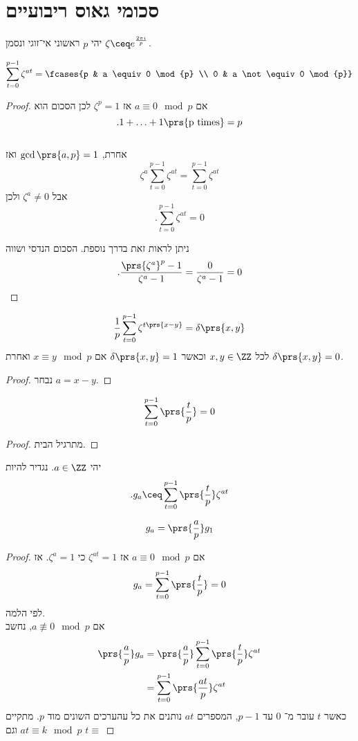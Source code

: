 \documentclass[a4paper,10pt,twoside,openany]{book}
\begin{document}
\section{סכומי גאוס ריבועיים}

יהי
$p$
ראשוני אי־זוגי ונסמן
$\zeta \ceq e^{\frac{2 \pi i}{p}}$.

\begin{lemma}
\[\sum_{t = 0}^{p-1} \zeta^{at} = \fcases{p & a \equiv 0 \mod{p} \\ 0 & a \not\equiv 0 \mod{p}}\]
\end{lemma}
\begin{proof}
אם
$a \equiv 0 \mod{p}$
אז
$\zeta^p = 1$
לכן הסכום הוא
\[ \text{.} 1 + \ldots + 1 \prs{\text{p times}} = p\]
\\
אחרת,
$\gcd \prs{a,p} = 1$
ואז
\[\zeta^a \sum_{t=0}^{p-1} \zeta^{at} = \sum_{t=0}^{p-1} \zeta^{at}\]
אבל
$\zeta^a \neq 0$
ולכן
\[\text{.} \sum_{t=0}^{p-1} \zeta^{at} = 0\]

ניתן לראות זאת בדרך נוספת. הסכום הנדסי ושווה
\begin{align*}
\text{.} \frac{\prs{\zeta^a}^p -1}{\zeta^a - 1} = \frac{0}{\zeta^a - 1} = 0
\end{align*}
\end{proof}

\begin{corollary}
\[\frac{1}{p} \sum_{t=0}^{p-1} \zeta^{t\prs{x-y}} = \delta\prs{x,y}\]
לכל
$x,y \in \ZZ$
וכאשר
$\delta\prs{x,y} = 1$
אם
$x \equiv y \mod {p}$
ואחרת
$\delta\prs{x,y} = 0$.
\end{corollary}
\begin{proof}
נבחר
$a = x-y$.
\end{proof}
\begin{lemma}
\[\sum_{t=0}^{p-1} \prs{\frac{t}{p}} = 0\]
\end{lemma}
\begin{proof}
מתרגיל הבית.
\end{proof}

\begin{definition}
יהי
$a\in \ZZ$.
נגדיר
להיות
\[\text{.} g_a \ceq \sum_{t=0}^{p-1} \prs{\frac{t}{p}} \zeta^{at}\]
\end{definition}

\begin{proposition}
\[g_a = \prs{\frac{a}{p}} g_1\]
\end{proposition}
\begin{proof}
אם
$a \equiv 0 \mod{p}$
אז
$\zeta^{at} = 1$
כי
$\zeta^a = 1$.
אז
\[g_a = \sum_{t=0}^{p-1}\prs{\frac{t}{p}} = 0\]
לפי הלמה.
\\
אם
$a \not\equiv 0 \mod{p}$,
נחשב
\begin{align*}
\prs{\frac{a}{p}} g_a &= \prs{\frac{a}{p}} \sum_{t=0}^{p-1} \prs{\frac{t}{p}} \zeta^{at} \\&=
\sum_{t=0}^{p-1}\prs{\frac{at}{p}} \zeta^{at}
\end{align*}
כאשר
$t$
עובר מ־%
$0$
עד
$p-1$,
המספרים
$at$
נותנים את כל עהערכים השונים מוד
$p$.
מתקיים
$at \equiv k \mod{p}$
וגם
$t \equiv $
\end{proof}
\end{document}
